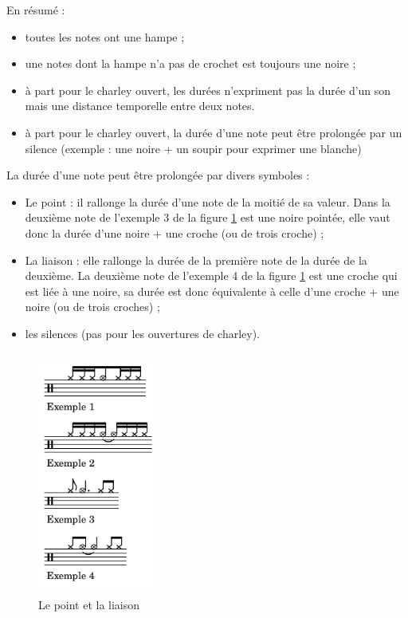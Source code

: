 En résumé :
\begin{itemize}
    \item toutes les notes ont une hampe ;
    \item une notes dont la hampe n’a pas de crochet est toujours une noire ;
    \item à part pour le charley ouvert, les durées n’expriment pas la durée
        d’un son mais une distance temporelle entre deux notes.
    \item à part pour le charley ouvert, la durée d’une note peut être
        prolongée par un silence (exemple : une noire + un soupir pour exprimer
        une blanche)\\
\end{itemize}
La durée d’une note peut être prolongée par divers symboles :
\begin{itemize}
	\item Le point : il rallonge la durée d’une note de la moitié de sa valeur.
        Dans la deuxième note de l’exemple 3 de la figure \ref{point_liaison}
        est une noire pointée, elle vaut donc la durée d’une noire + une croche
        (ou de trois croche) ;
	\item La liaison : elle rallonge la durée de la première note de la durée
        de la deuxième. La deuxième note de l’exemple 4 de la figure
        \ref{point_liaison} est une croche qui est liée à une noire, sa durée
        est donc équivalente à celle d’une croche + une noire (ou de trois
        croches) ;
    \item les silences (pas pour les ouvertures de charley).
\end{itemize}

\begin{figure}[h]
	\centering
	\includegraphics[height=80mm, width=40mm]{
    z_images/3_methodes/0_notation_de_la_batterie/3_point_et_liaison.png}
	\caption{Le point et la liaison}
	\label{point_liaison}
\end{figure}

